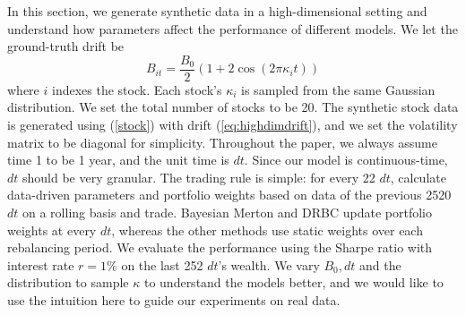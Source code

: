 \documentclass[11pt]{article}
\theoremstyle{definition}
\begin{document}
In this section, we generate synthetic data in a high-dimensional setting and understand how parameters affect the performance of different models. We let the ground-truth drift be 
\begin{equation}
    B_{it} = \frac{B_0}{2}\left(1 + 2\cos(2\pi\kappa_i t)\right) \label{eq:highdimdrift}
\end{equation} where $i$ indexes the stock. Each stock's $\kappa_i$ is sampled from the same Gaussian distribution. We set the total number of stocks to be 20. The synthetic stock data is generated using (\ref{stock}) with drift (\ref{eq:highdimdrift}), and we set the volatility matrix to be diagonal for simplicity. Throughout the paper, we always assume time 1 to be 1 year, and the unit time is $dt$. Since our model is continuous-time, $dt$ should be very granular. The trading rule is simple: for every 22 $dt$, calculate data-driven parameters and portfolio weights based on data of the previous 2520 $dt$ on a rolling basis and trade. Bayesian Merton and DRBC update portfolio weights at every \(dt\), whereas the other methods use static weights over each rebalancing period. We evaluate the performance using the Sharpe ratio with interest rate $r=1\%$ on the last 252 $dt$'s wealth. We vary $B_0,dt$ and the distribution to sample $\kappa$ to understand the models better, and we would like to use the intuition here to guide our experiments on real data. 
\end{document}
